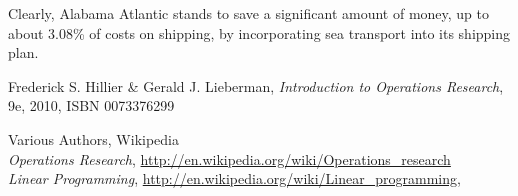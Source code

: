 \documentclass[12pt,letterpaper]{article}
\begin{document}
Clearly, Alabama Atlantic stands to save a significant amount of money, up to about 3.08\% of costs on shipping, by
incorporating sea transport into its shipping plan.


\begin{thebibliography}{44}
Frederick S. Hillier \& Gerald J. Lieberman, \emph{Introduction to Operations Research}, 9e, 2010, ISBN 0073376299

Various Authors, Wikipedia \\
\emph{Operations Research}, \href{http://en.wikipedia.org/wiki/Operations_research}{http://en.wikipedia.org/wiki/Operations\_research} \\
\emph{Linear Programming}, \href{http://en.wikipedia.org/wiki/Linear_programming}{http://en.wikipedia.org/wiki/Linear\_programming},
\end{thebibliography}
\end{document}
